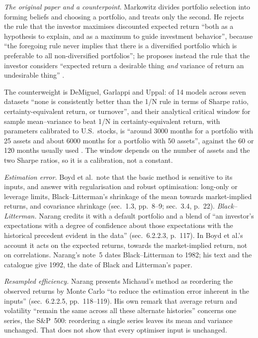 \begin{qfmodel}
\emph{The original paper and a counterpoint}. Markowitz divides portfolio selection into forming beliefs and choosing a portfolio, and treats only the second. He rejects the rule that the investor maximises discounted expected return ``both as a hypothesis to explain, and as a maximum to guide investment behavior'', because ``the foregoing rule never implies that there is a diversified portfolio which is preferable to all non-diversified portfolios''; he proposes instead the rule that the investor considers ``expected return a desirable thing \emph{and} variance of return an undesirable thing'' \citep[\emph{Journal of Finance} 7(1), 1952, p.~77]{s6-markowitz}.

The counterweight is DeMiguel, Garlappi and Uppal: of 14 models across seven datasets ``none is consistently better than the 1/N rule in terms of Sharpe ratio, certainty-equivalent return, or turnover'', and their analytical critical window for sample mean--variance to beat 1/N in certainty-equivalent return, with parameters calibrated to U.S.\ stocks, is ``around 3000 months for a portfolio with 25 assets and about 6000 months for a portfolio with 50 assets'', against the 60 or 120 months usually used \citep[\emph{RFS} 22(5), 2009, abstract, p.~1915, and sec.~1, p.~1919; authors' copy from an Internet Archive capture of an LBS faculty page]{s7-demiguel}. The window depends on the number of assets and the two Sharpe ratios, so it is a calibration, not a constant.

 \emph{Estimation error.} Boyd et al.\ note that the basic method is sensitive to its inputs, and answer with regularisation and robust optimisation: long-only or leverage limits, Black--Litterman's shrinkage of the mean towards market-implied returns, and covariance shrinkage (sec.~1.3, pp.~8--9; sec.~3.4, p.~22). \emph{Black--Litterman.} Narang credits it with a default portfolio and a blend of ``an investor's expectations with a degree of confidence about those expectations with the historical precedent evident in the data'' (sec.~6.2.2.3, p.~117). In Boyd et al.'s account it acts on the expected returns, towards the market-implied return, not on correlations. Narang's note~5 dates Black--Litterman to 1982; his text and the catalogue give 1992, the date of Black and Litterman's paper.

\emph{Resampled efficiency.} Narang presents Michaud's method as reordering the observed returns by Monte Carlo ``to reduce the estimation error inherent in the inputs'' (sec.~6.2.2.5, pp.~118--119). His own remark that average return and volatility ``remain the same across all these alternate histories'' concerns one series, the S\&P~500: reordering a single series leaves its mean and variance unchanged. That does not show that every optimiser input is unchanged.


\end{qfmodel}
